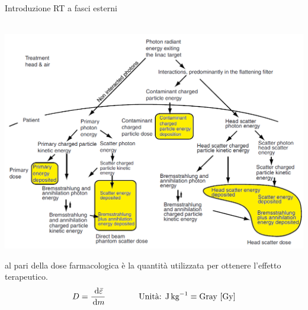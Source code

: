 \documentclass{beamer}
\newcommand{\de}{\,\textrm{d}}
\begin{document}
\begin{frame}{Introduzione RT a fasci esterni}
\begin{center}
\small
{}\\ \vspace{.2cm}
\includegraphics[width=.8\textwidth]{../cap1/processes.PNG}
\end{center}
\footnotesize
{} al pari della dose farmacologica è la quantità utilizzata per ottenere l'effetto terapeutico.
$$D = \frac{\de \bar{\varepsilon}}{\de m} \qquad\qquad \text{Unità: J\,kg}^{-1} \equiv \text{Gray [Gy]}$$
\end{frame}



\end{document}
